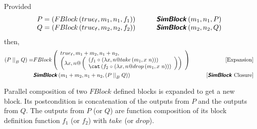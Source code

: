 \begin{theorem}
   Provided 
   \begin{align*}
       \begin{array}[]{ll}
           P = \left(FBlock\left( \logtrue{f}, m_1, n_1, f_1\right)\right) & \qquad \healthy{SimBlock}\left(m_1, n_1, P\right) \\ 
           Q = \left(FBlock\left( \logtrue{f}, m_2, n_2, f_2\right)\right) & \qquad \healthy{SimBlock}\left(m_2, n_2, Q\right) \\ 
       \end{array}
   \end{align*}
   then, 
   \begin{align*}
       \left(P \parallel_B Q\right) = & FBlock\left(
       \begin{array}[]{l}
            \logtrue{f}, m_1+m_2, n_1+n_2, \\
            \left(\lambda x, n @ 
                \left(
                \begin{array}[]{l}
                    \left(f_1 \circ \left(\lambda x, n @ take\left(m_1, x~n\right)\right)\right) \\
                    \cat \left(f_2 \circ \left(\lambda x, n @ drop\left(m_1, x~n\right)\right)\right) 
                \end{array}\right)\right) \\
       \end{array} \right)  & \tag*{[Expansion]} \\
       &\healthy{SimBlock}\left(m_1+m_2, n_1+n_2, \left(P \parallel_B Q\right)\right) & \tag*{[\healthy{SimBlock} Closure]} 
   \end{align*}
    \label{thm:parallel-exp}
\end{theorem}

Parallel composition of two $FBlock$ defined blocks is expanded to get a new block. Its postcondition is concatenation of the outputs from $P$ and the outputs from $Q$. The outputs from $P$ (or $Q$) are function composition of its block definition function $f_1$ (or $f_2$) with $take$ (or $drop$).

